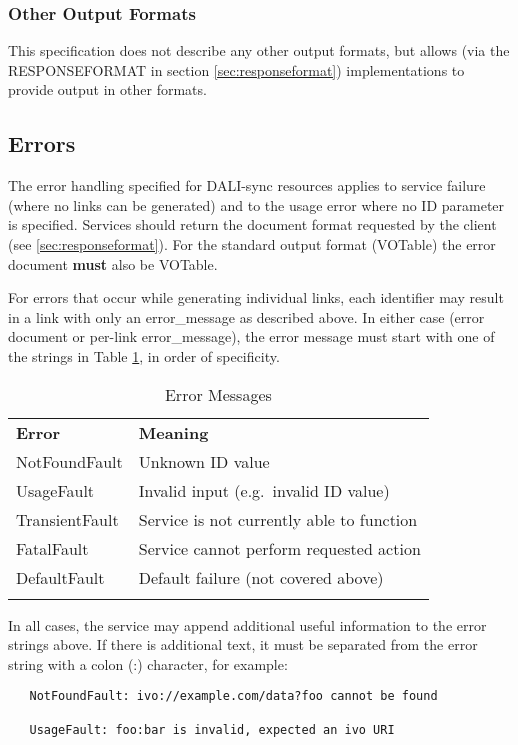 \documentclass[11pt,a4paper]{ivoa}
\begin{document}
\subsubsection{Other Output Formats}

This specification does not describe any other output formats, but allows
(via the RESPONSEFORMAT in section \ref{sec:responseformat})
implementations to provide
output in other formats.


\subsection{Errors}

The error handling specified for DALI-sync resources applies
to service failure (where no links can be generated) and to the usage
error where no ID parameter is specified. Services should return the
document format requested by the client (see \ref{sec:responseformat}).
For the standard
output format (VOTable) the error document {\bf must} also be VOTable.

For errors that occur while generating individual links, each
identifier may result in a link with only an error\_message
as described above.
In either case (error document or per-link error\_message),
the error message must start with one of the strings in
Table \ref{tab:errors}, in order of specificity.
\begin{table}[ht]
\begin{center}
\begin{tabular}{|l|l|}
\sptablerule
{\bf Error} & {\bf Meaning} \\
\sptablerule
NotFoundFault  & Unknown ID value    \\
UsageFault     & Invalid input (e.g.\ invalid ID value) \\
TransientFault & Service is not currently able to function \\
FatalFault     & Service cannot perform requested action \\
DefaultFault   & Default failure (not covered above) \\
\sptablerule
\end{tabular}
\end{center}
\caption{Error Messages}
\label{tab:errors}
\end{table}

In all cases, the service may append additional useful information to the
error strings above.
If there is additional text, it must be separated
from the error string with a colon (:) character, for example:
\begin{verbatim}
   NotFoundFault: ivo://example.com/data?foo cannot be found

   UsageFault: foo:bar is invalid, expected an ivo URI 
\end{verbatim}
\end{document}
